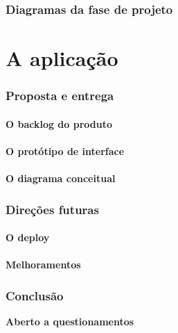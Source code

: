 \documentclass[hyperref={pdfpagelabels=false},11pt]{beamer}
\begin{document}
		\section{Diagramas da fase de projeto}
	\part{A aplicação}
		\section{Proposta e entrega}
			\subsection{O backlog do produto}
			\subsection{O protótipo de interface}
			\subsection{O diagrama conceitual}
		\section{Direções futuras}
			\subsection{O deploy}
			\subsection{Melhoramentos}
		\section{Conclusão}
			\begin{center}
				\textbf{Aberto a questionamentos}
			\end{center}
\end{document}

